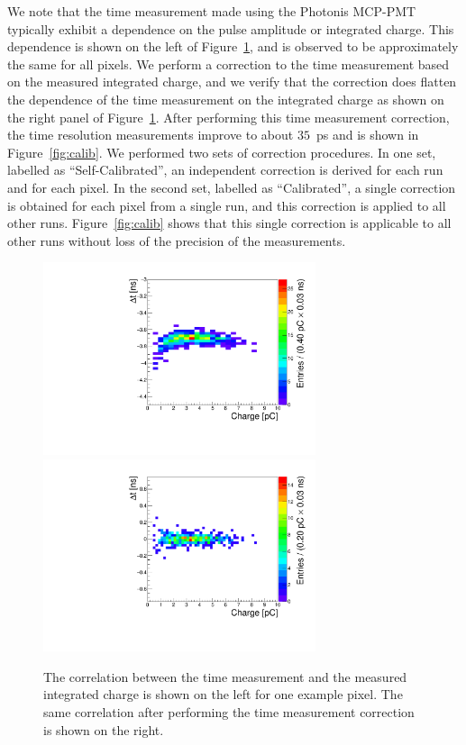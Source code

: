 \documentclass[12pt]{article}
\begin{document}
We note that the time measurement made using the Photonis MCP-PMT typically exhibit
a dependence on the pulse amplitude or integrated charge. This dependence is
shown on the left of Figure~\ref{fig:dt-int}, and is observed to be
approximately the same for all pixels. We perform a correction to the time
measurement based on the measured integrated charge, and we verify that the
correction does flatten the dependence of the time measurement on the integrated
charge as shown on the right panel of Figure~\ref{fig:dt-int}. After performing
this time measurement correction, the time resolution measurements improve to
about $35$~ps and is shown in Figure~\ref{fig:calib}. We performed two sets of
correction procedures. In one set, labelled as ``Self-Calibrated'', an
independent correction is derived for each run and for each pixel. In the second
set, labelled as ``Calibrated'', a single correction is obtained for each pixel
from a single run, and this correction is applied to all other runs.
Figure~\ref{fig:calib} shows that this single correction is applicable to all
other runs without loss of the precision of the measurements. 

\begin{figure}[htbp] 
\centering
\includegraphics[width=8cm]{Images/dt-int/dtint30_o22.pdf}
\includegraphics[width=8cm]{Images/dt-int/dtint30_c22.pdf} 
\caption{The correlation between the time measurement and the measured integrated charge is
shown on the left for one example pixel. The same correlation after performing
the time measurement correction is shown on the right. } 
\label{fig:dt-int}
\end{figure} 
\end{document}
